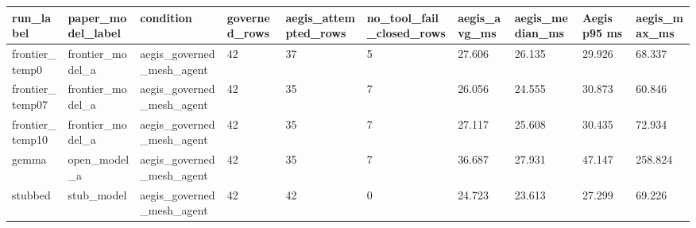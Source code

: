 \begin{tabular}{llllllllll}
 \hline
run\_label & paper\_model\_label & condition & governed\_rows & aegis\_attempted\_rows & no\_tool\_fail\_closed\_rows & aegis\_avg\_ms & aegis\_median\_ms & Aegis p95 ms & aegis\_max\_ms \\
 \hline
frontier\_temp0 & frontier\_model\_a & aegis\_governed\_mesh\_agent & 42 & 37 & 5 & 27.606 & 26.135 & 29.926 & 68.337 \\
frontier\_temp07 & frontier\_model\_a & aegis\_governed\_mesh\_agent & 42 & 35 & 7 & 26.056 & 24.555 & 30.873 & 60.846 \\
frontier\_temp10 & frontier\_model\_a & aegis\_governed\_mesh\_agent & 42 & 35 & 7 & 27.117 & 25.608 & 30.435 & 72.934 \\
gemma & open\_model\_a & aegis\_governed\_mesh\_agent & 42 & 35 & 7 & 36.687 & 27.931 & 47.147 & 258.824 \\
stubbed & stub\_model & aegis\_governed\_mesh\_agent & 42 & 42 & 0 & 24.723 & 23.613 & 27.299 & 69.226 \\
 \hline
\end{tabular}

